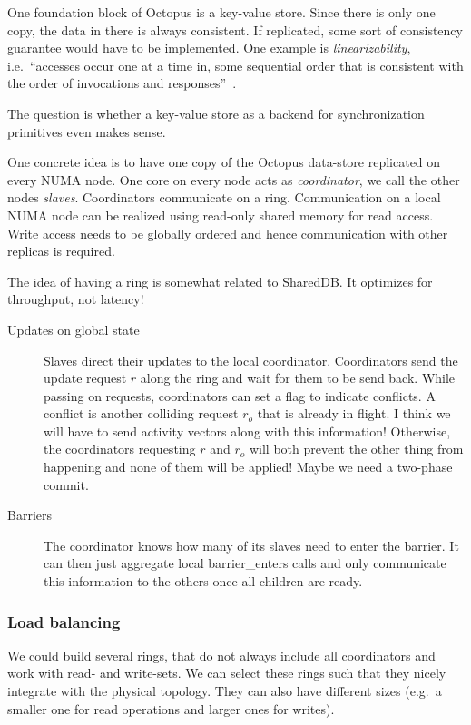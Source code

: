 \documentclass{article}
\begin{document}
One foundation block of Octopus is a key-value store. Since there is
only one copy, the data in there is always consistent. If replicated,
some sort of consistency guarantee would have to be implemented. One
example is \emph{linearizability}, i.e.\ ``accesses occur one at a time
in, some sequential order that is consistent with the order of
invocations and responses''~\cite{lynch}.

The question is whether a key-value store as a backend for
synchronization primitives even makes sense.

One concrete idea is to have one copy of the Octopus data-store
replicated on every NUMA node. One core on every node acts as
\emph{coordinator}, we call the other nodes \emph{slaves}.
Coordinators communicate on a ring. Communication on a local NUMA node
can be realized using read-only shared memory for read access. Write
access needs to be globally ordered and hence communication with other
replicas is required. 

The idea of having a ring is somewhat related to SharedDB. It
optimizes for throughput, not latency!

\begin{description}
\item[Updates on global state] Slaves direct their updates to the
  local coordinator. Coordinators send the update request $r$ along
  the ring and wait for them to be send back. While passing on
  requests, coordinators can set a flag to indicate conflicts. A
  conflict is another colliding request $r_o$ that is already in
  flight. I think we will have to send activity vectors along with
  this information! Otherwise, the coordinators requesting $r$ and
  $r_o$ will both prevent the other thing from happening and none of
  them will be applied! Maybe we need a two-phase commit.
\item[Barriers] The coordinator knows how many of its slaves need to
  enter the barrier. It can then just aggregate local barrier\_enters
  calls and only communicate this information to the others once all
  children are ready. 
\end{description}

\subsubsection{Load balancing}

We could build several rings, that do not always include all
coordinators and work with read- and write-sets. We can select these
rings such that they nicely integrate with the physical topology. They
can also have different sizes (e.g.\ a smaller one for read
operations and larger ones for writes).

\newpage



\label{LastPage}
\end{document}
